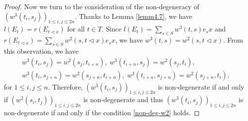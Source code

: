 \documentclass[a4paper,11pt]{amsart}
\numberwithin{equation}{section}
\begin{document}
\begin{proof}
 Now we turn to the consideration of the non-degeneracy of $(w^3(t_i,s_j))_{1\leq i,j \leq 2n}$. Thanks to Lemma \ref{lemm4.7}, we have $l(E_t)=r(E_{t\triangleleft x})$ for all $t\in T$. Since $l(E_t)=\sum_{s\in S}w^3(t,s)e_s x$ and $r(E_{t\triangleleft x})=\sum_{s\in S}w^2(s,t\triangleleft x)e_s x$, we have $w^3(t,s)=w^2(s,t\triangleleft x)$. From this observation,  we have
\begin{gather*}
w^3(t_i,s_j)=w^2(s_j,t_{i+n}),\;w^3(t_{i+n},s_j)=w^2(s_j,t_i),\\
w^3(t_{i},s_{j+n})=w^2(s_{j+n},t_{i+n}),\;w^3(t_{i+n},s_{j+n})=w^2(s_{j+n},t_i),
\end{gather*}
for $1\leq i,j \leq n$. Therefore, $(w^3(t_i,s_j))_{1\leq i,j \leq 2n}$ is non-degenerate if and only if $(w^2(s_i,t_j))_{1\leq i,j \leq 2n}$ is non-degenerate and thus $(w^3(t_i,s_j))_{1\leq i,j \leq 2n}$ is non-degenerate if and only if the condition \eqref{non-deg-w2} holds.


\end{proof}
\end{document}
